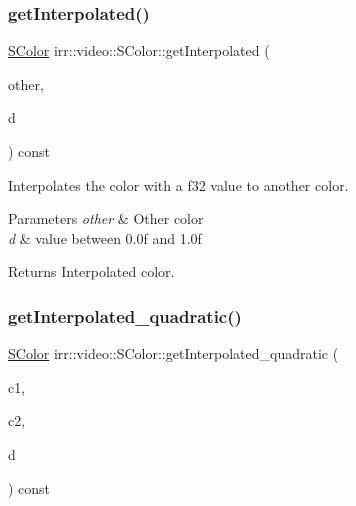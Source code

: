 \subsubsection{\texorpdfstring{get\+Interpolated()}{getInterpolated()}\hspace{0.1cm}{\footnotesize\ttfamily [2/2]}}
{\footnotesize\ttfamily \hyperlink{classirr_1_1video_1_1SColor}{S\+Color} irr\+::video\+::\+S\+Color\+::get\+Interpolated (\begin{DoxyParamCaption}\item[{const \hyperlink{classirr_1_1video_1_1SColor}{S\+Color} \&}]{other,  }\item[{\hyperlink{namespaceirr_a0277be98d67dc26ff93b1a6a1d086b07}{f32}}]{d }\end{DoxyParamCaption}) const\hspace{0.3cm}{\ttfamily [inline]}}



Interpolates the color with a f32 value to another color. 


\begin{DoxyParams}{Parameters}
{\em other} & Other color \\
\hline
{\em d} & value between 0.\+0f and 1.\+0f \\
\hline
\end{DoxyParams}
\begin{DoxyReturn}{Returns}
Interpolated color. 
\end{DoxyReturn}
\mbox{\label{classirr_1_1video_1_1SColor_addb63c4b8832c9bb01e4861e692e5f4f}} 
\subsubsection{\texorpdfstring{get\+Interpolated\+\_\+quadratic()}{getInterpolated\_quadratic()}\hspace{0.1cm}{\footnotesize\ttfamily [1/2]}}
{\footnotesize\ttfamily \hyperlink{classirr_1_1video_1_1SColor}{S\+Color} irr\+::video\+::\+S\+Color\+::get\+Interpolated\+\_\+quadratic (\begin{DoxyParamCaption}\item[{const \hyperlink{classirr_1_1video_1_1SColor}{S\+Color} \&}]{c1,  }\item[{const \hyperlink{classirr_1_1video_1_1SColor}{S\+Color} \&}]{c2,  }\item[{\hyperlink{namespaceirr_a0277be98d67dc26ff93b1a6a1d086b07}{f32}}]{d }\end{DoxyParamCaption}) const\hspace{0.3cm}{\ttfamily [inline]}}



